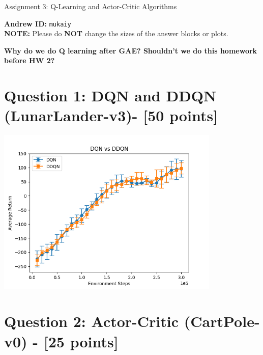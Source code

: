 \documentclass{article}
\begin{document}

\begin{centering}
    {\Large Assignment 3: Q-Learning and Actor-Critic Algorithms
    } \\
    \vspace{.25cm}
\end{centering}
\vspace{0.25cm}

\textbf{Andrew ID:} \texttt{mukaiy} \\
\textbf{NOTE:} Please do \textbf{NOT} change the sizes of the answer blocks or plots.

\textbf{Why do we do Q learning after GAE? Shouldn't we do this homework before HW 2?}

\setcounter{section}{0}
\section{Question 1: DQN and DDQN (LunarLander-v3)- [50 points]}

\begin{answer}[title=Question 1,height=9.5cm,width=\linewidth]
    \centering
    \includegraphics[height=8cm, width=.99\linewidth]{figs/Q1.png}
\end{answer}

\section{Question 2: Actor-Critic (CartPole-v0) - [25 points]}
\end{document}
